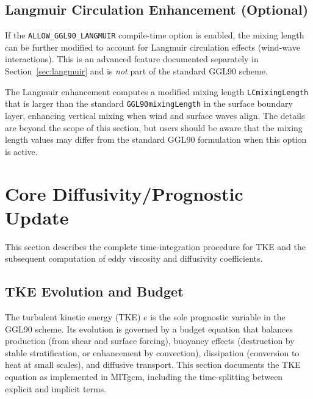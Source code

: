 \documentclass[12pt,letterpaper]{article}
\begin{document}
\subsection{Langmuir Circulation Enhancement (Optional)}
\label{sec:mxl_langmuir}

If the \verb|ALLOW_GGL90_LANGMUIR| compile-time option is enabled, the mixing length can be further modified to account for Langmuir circulation effects (wind-wave interactions). This is an advanced feature documented separately in Section~\ref{sec:langmuir} and is \emph{not} part of the standard GGL90 scheme.

The Langmuir enhancement computes a modified mixing length \verb|LCmixingLength| that is larger than the standard \verb|GGL90mixingLength| in the surface boundary layer, enhancing vertical mixing when wind and surface waves align. The details are beyond the scope of this section, but users should be aware that the mixing length values may differ from the standard GGL90 formulation when this option is active.

\section{Core Diffusivity/Prognostic Update}
\label{sec:core_update}

This section describes the complete time-integration procedure for TKE and the subsequent computation of eddy viscosity and diffusivity coefficients.

\subsection{TKE Evolution and Budget}
\label{sec:tke_evolution}

The turbulent kinetic energy (TKE) $e$ is the sole prognostic variable in the GGL90 scheme. Its evolution is governed by a budget equation that balances production (from shear and surface forcing), buoyancy effects (destruction by stable stratification, or enhancement by convection), dissipation (conversion to heat at small scales), and diffusive transport. This section documents the TKE equation as implemented in MITgcm, including the time-splitting between explicit and implicit terms.
\end{document}
